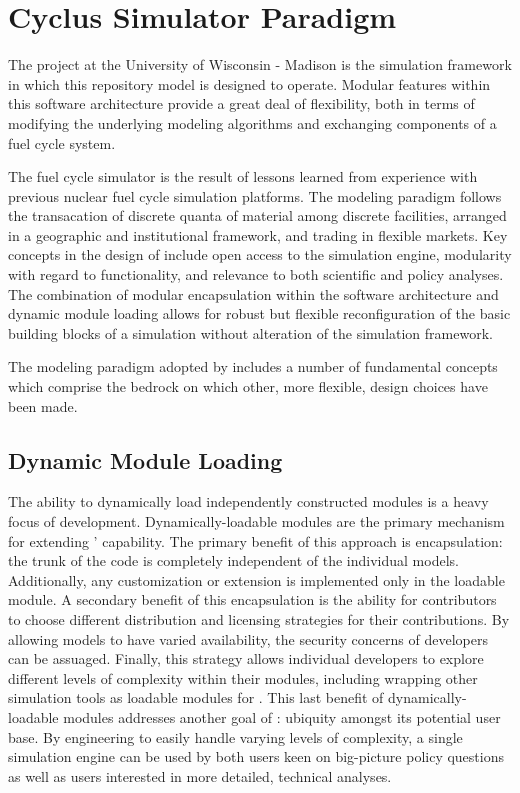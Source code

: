 \section{Cyclus Simulator Paradigm }

The \Cyclus project at the University of Wisconsin - Madison is the 
simulation framework in which this repository model is designed to 
operate.  Modular features within this software architecture provide a 
great deal of flexibility, both in terms of modifying the underlying 
modeling algorithms and exchanging components of a fuel cycle system.

The \Cyclus fuel cycle simulator is the  result of lessons learned 
from experience with previous nuclear fuel cycle simulation platforms.  
The modeling paradigm follows the transacation of discrete quanta of 
material among discrete facilities, arranged in a geographic and 
institutional framework, and trading in
flexible markets. Key concepts in the design of \Cyclus include open
access to the simulation engine, modularity with regard to
functionality, and relevance to both scientific and policy
analyses. The combination of modular encapsulation within the
software architecture and dynamic module loading allows for robust but 
flexible reconfiguration of the basic building blocks of a simulation 
without alteration of the simulation framework.  

The modeling paradigm adopted by \Cyclus includes a number of
fundamental concepts which comprise the bedrock on which other, more
flexible, design choices have been made. 

\subsection{Dynamic Module Loading}

The ability to dynamically load independently constructed modules is a
heavy focus of \Cyclus development. Dynamically-loadable modules are
the primary mechanism for extending \Cyclus' capability. The primary
benefit of this approach is encapsulation: the trunk of the code is
completely independent of the individual models. Additionally, any
customization or extension is implemented only in the loadable
module. A secondary benefit of this encapsulation is the ability for
contributors to choose different distribution and licensing strategies
for their contributions. By allowing models to have varied
availability, the security concerns of developers can be
assuaged. Finally, this strategy allows individual developers to
explore different levels of complexity within their modules, including
wrapping other simulation tools as loadable modules for \Cyclus. This
last benefit of dynamically-loadable modules addresses another goal of
\Cyclus: ubiquity amongst its potential user base. By engineering
\Cyclus to easily handle varying levels of complexity, a single
simulation engine can be used by both users keen on big-picture policy
questions as well as users interested in more detailed, technical
analyses.

